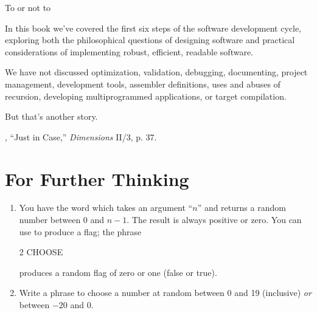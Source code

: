 \begin{tfquot}
To  or not to 
\end{tfquot}
In this book we've covered the first six steps of the software development
cycle, exploring both the philosophical questions of designing software
and practical considerations of implementing robust, efficient, readable
software.

We have not discussed optimization, validation, debugging, documenting,
project management, \Forth{} development tools, assembler
definitions, uses and abuses of recursion, developing multiprogrammed
applications, or target compilation.

But that's another story.

\begin{references}{9}
 , ``Just in Case,'' \emph{\Forth{}
Dimensions} II/3, p. 37.
\end{references}

\section{For Further Thinking}

\ifeightyfour\begin{enumerate}
\item\fi You have the word  which takes an argument ``$n$''
and returns a random number between 0 and $n-1$. The result is always
positive or zero.  You can use  to produce a flag; the
phrase
\begin{Code}
2 CHOOSE
\end{Code}
produces a random flag of zero or one (false or true).

\ifeightyfour\item\fi
Write a phrase to choose a number at random between 0 and 19 (inclusive)
\emph{or} between $-20$ and 0.
\ifeightyfour\end{enumerate}\fi
